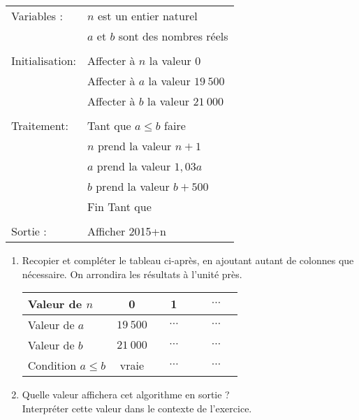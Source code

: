 \begin{center}
     \begin{extern}%
          \begin{tabularx}{0.60\linewidth}{|l|X|}\hline
               Variables :	& $n$ est un entier naturel\\
               &$a$ et $b$ sont des nombres réels\\
               & \\
               Initialisation: &Affecter à $n$ la valeur 0\\
               &Affecter à $a$ la valeur $19\ 500$\\
               &Affecter à $b$ la valeur $21\ 000$\\
               & \\
               Traitement: &Tant que $a \leqslant  b$ faire\\
               &\qquad$n$ prend la valeur $n + 1$\\
               &\qquad$a$ prend la valeur $1,03a$\\
               &\qquad$b$ prend la valeur $b+500$\\
               &Fin Tant que\\
               & \\
               Sortie :	&Afficher 2015+n \\
               \hline
          \end{tabularx}
     \end{extern}
\end{center}
\par
\begin{enumerate}
     \item Recopier et compléter le tableau ci-après, en ajoutant autant de colonnes que nécessaire. On arrondira les résultats à l'unité près.
     \begin{center}
          \begin{tabular}{|l|c|c|c|}\hline %
               Valeur de $n$	&0	&	1 &	 $\quad \cdots \quad$  \\ \hline
               Valeur de $a$	&$19\ 500$	& $\quad \cdots \quad$ & $\quad \cdots \quad$ 	 \\ \hline
               Valeur de $b$	&$21\ 000$	& $\quad \cdots \quad$ & $\quad \cdots \quad$  \\ \hline
               Condition $a \leqslant  b$	&vraie	& $\quad \cdots \quad$ & $\quad \cdots \quad$ 	\\ \hline
          \end{tabular}
     \end{center}
     \item Quelle valeur affichera cet algorithme en sortie ?\\
     Interpréter cette valeur dans le contexte de l'exercice.
\end{enumerate}
